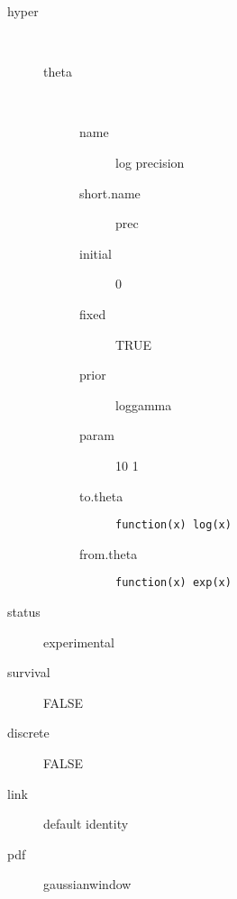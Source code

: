 \begin{description}
	\item[hyper]\ 
	 \begin{description}
	 	\item[theta]\ 
	 	 \begin{description}
	 	 	\item[name] log precision
	 	 	\item[short.name] prec
	 	 	\item[initial] 0
	 	 	\item[fixed] TRUE
	 	 	\item[prior] loggamma
	 	 	\item[param] 10 1
	 	 	\item[to.theta] \verb|function(x) log(x)|
	 	 	\item[from.theta] \verb|function(x) exp(x)|
	 	 \end{description}
	 \end{description}
	\item[status] experimental
	\item[survival] FALSE
	\item[discrete] FALSE
	\item[link] default identity
	\item[pdf] gaussianwindow
\end{description}
